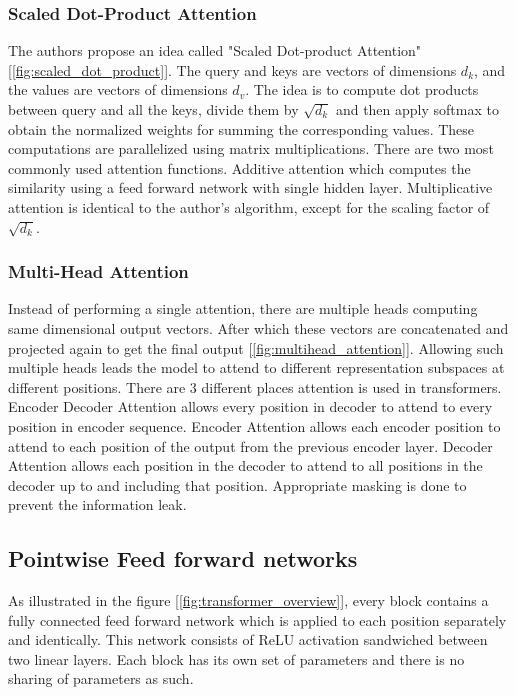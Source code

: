 \documentclass{article}
\begin{document}
\subsubsection{Scaled Dot-Product Attention}
The authors propose an idea called "Scaled Dot-product Attention" [\ref{fig:scaled_dot_product}]. The query and keys are vectors of dimensions $d_k$, and the values are vectors of dimensions $d_v$. The idea is to compute dot products between query and all the keys, divide them by $\sqrt{d_k}$ and then apply softmax to obtain the normalized weights for summing the corresponding values. These computations are parallelized using matrix multiplications. There are two most commonly used attention functions. Additive attention \cite{bahdanau2014neural} which computes the similarity using a feed forward network with single hidden layer. Multiplicative attention is identical to the author's algorithm, except for the scaling factor of $\sqrt{d_k}$.

\subsubsection{Multi-Head Attention}
Instead of performing a single attention, there are multiple heads computing same dimensional output vectors. After which these vectors are concatenated and projected again to get the final output [\ref{fig:multihead_attention}]. Allowing such multiple heads leads the model to attend to different representation subspaces at different positions. There are 3 different places attention is used in transformers. Encoder Decoder Attention allows every position in decoder to attend to every position in encoder sequence. Encoder Attention allows each encoder position to attend to each position of the output from the previous encoder layer. Decoder Attention allows each position in the decoder to attend to all positions in the decoder up to and including that position. Appropriate masking is done to prevent the information leak.

\subsection{Pointwise Feed forward networks}
As illustrated in the figure [\ref{fig:transformer_overview}], every block contains a fully connected feed forward network which is applied to each position separately and identically. This network consists of ReLU activation sandwiched between two linear layers. Each block has its own set of parameters and there is no sharing of parameters as such.
\end{document}
